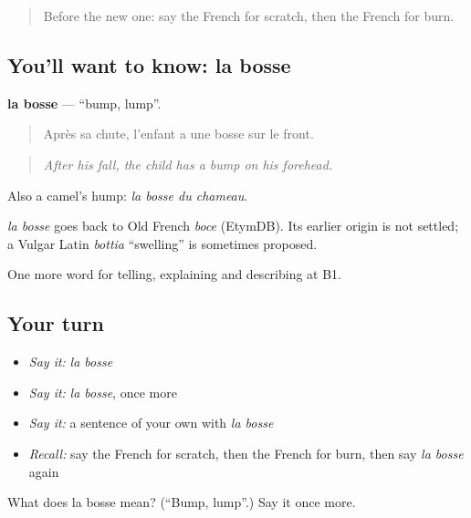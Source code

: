 \label{lesson:FR-C479-bosse}



\begin{quote}
Before the new one: say the French for scratch, then the French for burn.
\end{quote}

\subsection*{You'll want to know: la bosse}
\textbf{la bosse} — \textquotedblleft{}bump, lump\textquotedblright{}.

\begin{quote}
Après sa chute, l'enfant a une bosse sur le front.
\end{quote}

\begin{quote}
\emph{After his fall, the child has a bump on his forehead.}
\end{quote}

Also a camel's hump: \emph{la bosse du chameau}.

\begin{cousinweb}
\emph{la bosse} goes back to Old French \emph{boce} (EtymDB). Its earlier origin is not settled; a Vulgar Latin \emph{bottia} \textquotedblleft{}swelling\textquotedblright{} is sometimes proposed.
\end{cousinweb}

\begin{grammarlens}[title={What you've built}]
One more word for telling, explaining and describing at B1.
\end{grammarlens}

\subsection*{Your turn}
\begin{itemize}
\raggedright
  \item \emph{Say it:} \emph{la bosse}
  \item \emph{Say it:} \emph{la bosse}, once more
  \item \emph{Say it:} a sentence of your own with \emph{la bosse}
  \item \emph{Recall:} say the French for scratch, then the French for burn, then say \emph{la bosse} again
\end{itemize}

\begin{tcolorbox}[breakable,colback=teal!4,colframe=teal!35!black,title={Before you move on}]
What does la bosse mean? (\textquotedblleft{}Bump, lump\textquotedblright{}.) Say it once more.
\end{tcolorbox}
